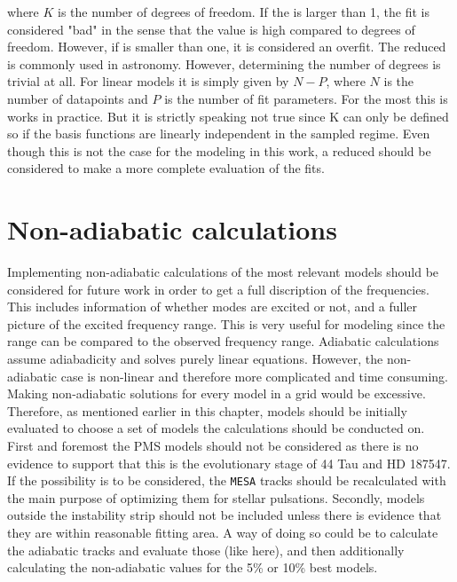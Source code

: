 \noindent where $K$ is the number of degrees of freedom. If the \chis is larger than 1, the fit is considered "bad" in the sense that the value is high compared to degrees of freedom. However, if \chis is smaller than one, it is considered an overfit. The reduced \chis is commonly used in astronomy. However, determining the number of degrees is trivial at all. For linear models it is simply given by $N-P$, where $N$ is the number of datapoints and $P$ is the number of fit parameters. For the most this is works in practice. But it is strictly speaking not true  since K can only be defined so if the basis functions are linearly independent in the sampled regime. Even though this is not the case for the modeling in this work, a reduced \chis should be considered to make a more complete evaluation of the \chis fits. 

\section{Non-adiabatic calculations}

Implementing non-adiabatic calculations of the most relevant models should be considered for future work in order to get a full discription of the frequencies. This includes information of whether modes are excited or not, and a fuller picture of the excited frequency range. This is very useful for modeling since the range can be compared to the observed frequency range. Adiabatic calculations assume adiabadicity and solves purely linear equations. However, the non-adiabatic case is non-linear and therefore more complicated and time consuming. Making non-adiabatic solutions for every model in a grid would be excessive. Therefore, as mentioned earlier in this chapter, models should be initially evaluated to choose a set of models the calculations should be conducted on. First and foremost the PMS models should not be considered as there is no evidence to support that this is the evolutionary stage of 44 Tau and HD 187547. If the possibility is to be considered, the \texttt{MESA} tracks should be recalculated with the main purpose of optimizing them for stellar pulsations.  Secondly, models outside the instability strip should not be included unless there is evidence that they are within reasonable fitting area. A way of doing so could be to calculate the adiabatic tracks and evaluate those (like here), and then additionally calculating the non-adiabatic values for the 5\% or 10\% best models. 

